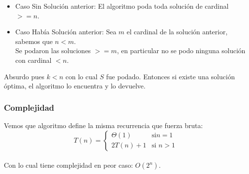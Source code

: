 \begin{itemize}
	\item Caso Sin Soluci\'on anterior: El algoritmo poda toda soluci\'on de cardinal $>= n$.
	\item Caso Hab\'ia Soluci\'on anterior: Sea $m$ el cardinal de la soluci\'on anterior, sabemos que $n < m$.\\
	Se podaron las soluciones $>= m$, en particular no se podo ninguna soluci\'on con cardinal $< n$.\\
\end{itemize}	
Absurdo pues $k < n$ con lo cual $S$ fue podado.
Entonces si existe una soluci\'on \'optima, el algoritmo lo encuentra y lo devuelve.
\subsubsection{Complejidad}
Vemos que algoritmo define la misma recurrencia que fuerza bruta:\\
$$
T(n) = \left\{
\begin{array}{cl}
 \Theta (1) &\mbox{si
} n = 1 \\
2T(n)+1&\mbox{si } n > 1
\end{array}\right.
$$
\\
Con lo cual tiene complejidad en peor caso: $O(2^{n})$.\\